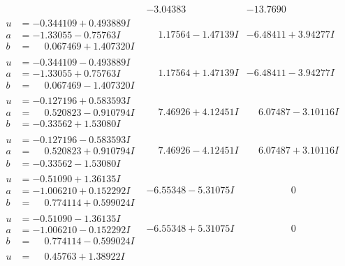 \documentclass[1p]{elsarticle_modified}
\theoremstyle{definition}
\begin{document}
$$\begin{array}{c|c|c}
 & -3.04383\phantom{ +0.000000I} & -13.7690\phantom{ +0.000000I} \\ \hline\begin{aligned}
u &= -0.344109 + 0.493889 I \\
a &= -1.33055 - 0.75763 I \\
b &= \phantom{-}0.067469 + 1.407320 I\end{aligned}
 & \phantom{-}1.17564 - 1.47139 I & -6.48411 + 3.94277 I \\ \hline\begin{aligned}
u &= -0.344109 - 0.493889 I \\
a &= -1.33055 + 0.75763 I \\
b &= \phantom{-}0.067469 - 1.407320 I\end{aligned}
 & \phantom{-}1.17564 + 1.47139 I & -6.48411 - 3.94277 I \\ \hline\begin{aligned}
u &= -0.127196 + 0.583593 I \\
a &= \phantom{-}0.520823 - 0.910794 I \\
b &= -0.33562 + 1.53080 I\end{aligned}
 & \phantom{-}7.46926 + 4.12451 I & \phantom{-}6.07487 - 3.10116 I \\ \hline\begin{aligned}
u &= -0.127196 - 0.583593 I \\
a &= \phantom{-}0.520823 + 0.910794 I \\
b &= -0.33562 - 1.53080 I\end{aligned}
 & \phantom{-}7.46926 - 4.12451 I & \phantom{-}6.07487 + 3.10116 I \\ \hline\begin{aligned}
u &= -0.51090 + 1.36135 I \\
a &= -1.006210 + 0.152292 I \\
b &= \phantom{-}0.774114 + 0.599024 I\end{aligned}
 & -6.55348 - 5.31075 I & \phantom{-0.000000 } 0 \\ \hline\begin{aligned}
u &= -0.51090 - 1.36135 I \\
a &= -1.006210 - 0.152292 I \\
b &= \phantom{-}0.774114 - 0.599024 I\end{aligned}
 & -6.55348 + 5.31075 I & \phantom{-0.000000 } 0 \\ \hline\begin{aligned}
u &= \phantom{-}0.45763 + 1.38922 I \\

\end{aligned}
\end{array}$$
\end{document}
